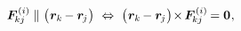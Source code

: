 \nopagebreak\vspace{-0.1em}\begin{equation*}
\bm{F}^{\smthinternal}_{\hspace{-0.16ex}kj} \hspace{.15ex} \parallel \hspace{.1ex} \bigl( \hspace{.1ex} \locationvector_k \hspace{-0.15ex} - \locationvector_{\hspace{-0.16ex}j} \hspace{.1ex} \bigr)
\hspace{.33em} \Leftrightarrow \hspace{.33em}
\bigl( \hspace{.1ex} \locationvector_k \hspace{-0.15ex} - \locationvector_{\hspace{-0.16ex}j} \hspace{.1ex} \bigr) \hspace{-0.35ex} \times \hspace{-0.2ex} \bm{F}^{\smthinternal}_{\hspace{-0.16ex}kj} = \bm{0}
\hspace{.1ex} ,
\end{equation*}

